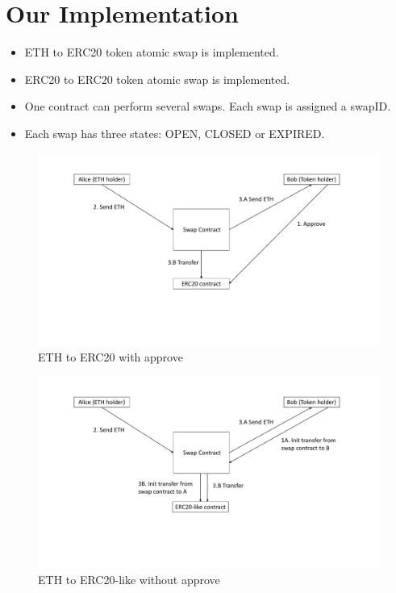 \section{Our Implementation}

\begin{itemize}
  \item ETH to ERC20 token atomic swap is implemented.
  \item ERC20 to ERC20 token atomic swap is implemented.
  \item One contract can perform several swaps. Each swap is assigned a swapID.
  \item Each swap has three states: OPEN, CLOSED or EXPIRED.
\end{itemize}

\begin{figure}[h!]
\centering
\includegraphics[width=1\textwidth]{approve}
\caption{ETH to ERC20 with approve}
\label{fig:withapprove}
\vspace{-10pt}
\end{figure}

\begin{figure}[h!]
\centering
\includegraphics[width=1\textwidth]{withoutapprove}
\caption{ETH to ERC20-like without approve}
\label{fig:withoutapprove}
\vspace{-10pt}
\end{figure}

